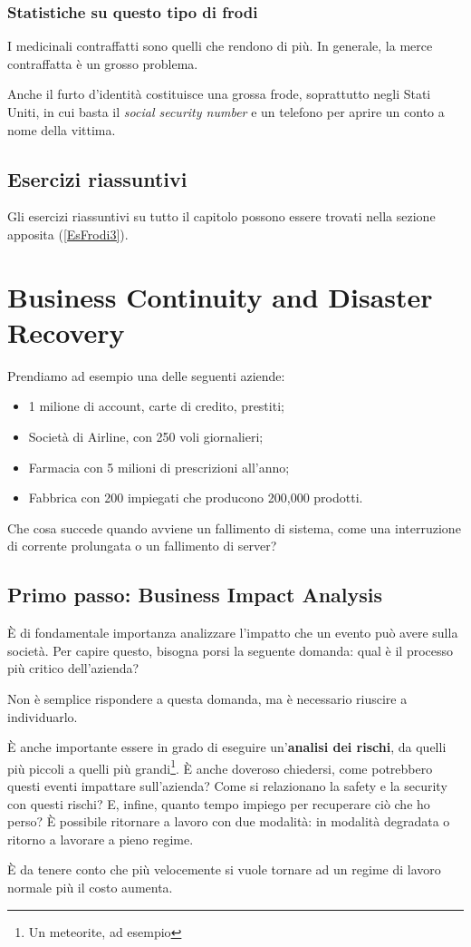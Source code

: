 \subsection{Statistiche su questo tipo di frodi}

I medicinali contraffatti sono quelli che rendono di più. In generale, la merce
contraffatta è un grosso problema.

Anche il furto d'identità costituisce una grossa frode, soprattutto negli
Stati Uniti, in cui basta il \emph{social security number} e un telefono per aprire un conto
a nome della vittima.

\section{Esercizi riassuntivi}

Gli esercizi riassuntivi su tutto il capitolo possono essere trovati nella
sezione apposita (\ref{EsFrodi3}).

\chapter{Business Continuity and Disaster Recovery}
\label{BCDR}

Prendiamo ad esempio una delle seguenti aziende:
\begin{itemize}
  \item 1 milione di account, carte di credito, prestiti;
  \item Società di Airline, con 250 voli giornalieri;
  \item Farmacia con 5 milioni di prescrizioni all'anno;
  \item Fabbrica con 200 impiegati che producono 200,000 prodotti.
\end{itemize}

Che cosa succede quando avviene un fallimento di sistema, come una interruzione
di corrente prolungata o un fallimento di server?

\section{Primo passo: Business Impact Analysis}

È di fondamentale importanza analizzare l'impatto che un evento può avere sulla
società. Per capire questo, bisogna porsi la seguente domanda: qual è il
processo più critico dell'azienda?

Non è semplice rispondere a questa domanda, ma è necessario riuscire a
individuarlo.

È anche importante essere in grado di eseguire un'\textbf{analisi dei rischi},
da quelli più piccoli a quelli più grandi\footnote{Un meteorite, ad esempio}. È
anche doveroso chiedersi, come potrebbero questi eventi impattare sull'azienda?
Come si relazionano la safety e la security con questi rischi? E, infine,
quanto tempo impiego per recuperare ciò che ho perso? È possibile ritornare a
lavoro con due modalità: in modalità degradata o ritorno a lavorare a pieno 
regime.

È da tenere conto che più velocemente si vuole tornare ad un regime di lavoro
normale più il costo aumenta.
